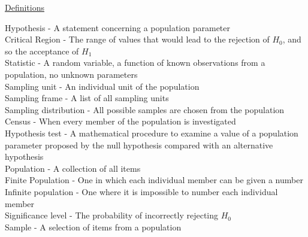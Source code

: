 \documentclass{article}[18pt]
\begin{document}
\begin{center}
\underline{\huge Definitions}
\end{center}
\large
Hypothesis - A statement concerning a population parameter\\
Critical Region - The range of values that would lead to the rejection of $H_0$, and so the acceptance of $H_1$\\
Statistic - A random variable, a function of known observations from a population, no unknown parameters\\
Sampling unit - An individual unit of the population\\
Sampling frame - A list of all sampling units\\
Sampling distribution - All possible samples are chosen from the population\\
Census - When every member of the population is investigated\\
Hypothesis test - A mathematical procedure to examine a value of
a population parameter proposed by the null hypothesis compared with an alternative hypothesis\\
Population - A collection of all items\\
Finite Population - One in which each individual member can be given a number\\
Infinite population - One where it is impossible to number each individual member\\
Significance level - The probability of incorrectly rejecting $H_0$\\
Sample - A selection of items from a population\\
\end{document}
